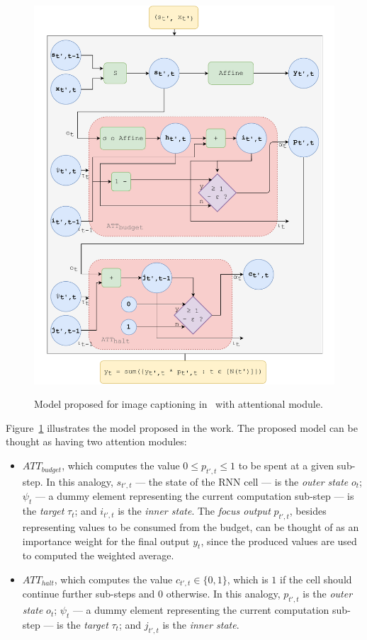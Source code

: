 \documentclass[11pt]{article}
\begin{document}
\begin{figure}[H]
    \centering
    \includegraphics[width=0.75\linewidth]{./img/act.pdf}\label{fig:act}
    \caption{Model proposed for image captioning in~\cite{ref:act} with attentional module.}
\end{figure}

Figure~\ref{fig:act} illustrates the model proposed in the work.
The proposed model can be thought as having two attention modules:
\begin{itemize}
    \item \textbf{$ATT_{budget}$}, which computes the value $0 \le p_{t',t} \le 1$ to be spent at a given sub-step.
        In this analogy, $s_{t',t}$ --- the state of the RNN cell --- is the \emph{outer state} $o_t$;
        $\psi_t$ --- a dummy element representing the current computation sub-step --- is the \emph{target} $\tau_t$;
        and $i_{t',t}$ is the \emph{inner state}.
        The \emph{focus output} $p_{t',t}$, besides representing values to be consumed from the budget,
        can be thought of as an importance weight for the final output $y_t$, since the produced values are used to computed
        the weighted average.
    \item \textbf{$ATT_{halt}$}, which computes the value $c_{t',t} \in \{0, 1\}$, which is $1$ if the cell should continue
        further sub-steps and $0$ otherwise.
        In this analogy, $p_{t',t}$ is the \emph{outer state} $o_t$;
        $\psi_t$ --- a dummy element representing the current computation sub-step --- is the \emph{target} $\tau_t$;
        and $j_{t',t}$ is the \emph{inner state}.
\end{itemize}
\end{document}
